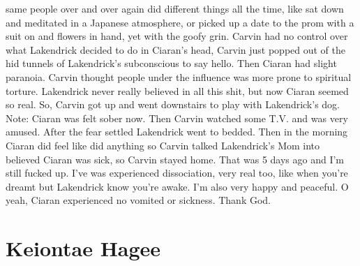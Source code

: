 \documentclass[12pt]{book}
\begin{document}
same people over and over again did different things all the time, like sat down and meditated in a Japanese atmosphere, or picked up a date to the prom with a suit on and flowers in hand, yet with the goofy grin. Carvin had no control over what Lakendrick decided to do in Ciaran's head, Carvin just popped out of the hid tunnels of Lakendrick's subconscious to say hello. Then Ciaran had slight paranoia. Carvin thought people under the influence was more prone to spiritual torture. Lakendrick never really believed in all this shit, but now Ciaran seemed so real. So, Carvin got up and went downstairs to play with Lakendrick's dog. Note: Ciaran was felt sober now. Then Carvin watched some T.V. and was very amused. After the fear settled Lakendrick went to bedded. Then in the morning Ciaran did feel like did anything so Carvin talked Lakendrick's Mom into believed Ciaran was sick, so Carvin stayed home. That was 5 days ago and I'm still fucked up. I've was experienced dissociation, very real too, like when you're dreamt but Lakendrick know you're awake. I'm also very happy and peaceful. O yeah, Ciaran experienced no vomited or sickness. Thank God.



\chapter{Keiontae Hagee}
\end{document}
